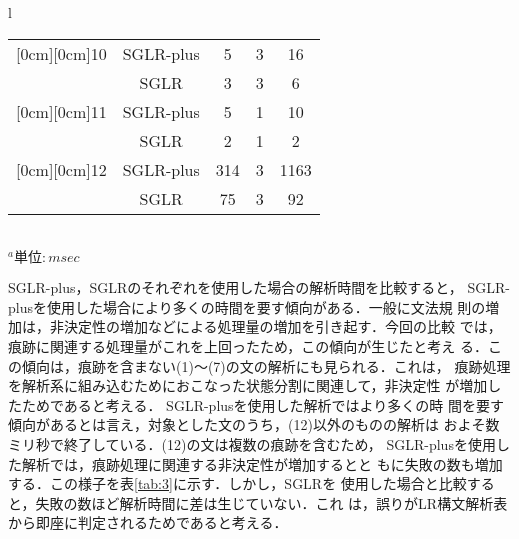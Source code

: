 \begin{table}[htbp]
\begin{center}
\begin{tabular}[htbp]{l}
\begin{tabular}[htbp]{|c||c|c|c|c|}
        \raisebox{-1.5ex}[0cm][0cm]{10} & SGLR-plus & 5  & 3  & 16 \\ \cline{2-5}
                                        & SGLR      & 3  & 3  & 6  \\ \hline\hline
        \raisebox{-1.5ex}[0cm][0cm]{11} & SGLR-plus & 5  & 1  & 10 \\ \cline{2-5}
                                        & SGLR      & 2  & 1  & 2  \\ \hline\hline
        \raisebox{-1.5ex}[0cm][0cm]{12} & SGLR-plus & 314 & 3  & 1163 \\ \cline{2-5}
                                        & SGLR      & 75  & 3  & 92  \\ \hline
      \end{tabular} \\
      $　^{a}単位: msec$
    \end{tabular}
  \end{center}
\end{table}

\vspace{-3mm}
SGLR-plus，SGLRのそれぞれを使用した場合の解析時間を比較すると，
SGLR-plusを使用した場合により多くの時間を要す傾向がある．一般に文法規
則の増加は，非決定性の増加などによる処理量の増加を引き起す．今回の比較
では，痕跡に関連する処理量がこれを上回ったため，この傾向が生じたと考え
る．この傾向は，痕跡を含まない(1)〜(7)の文の解析にも見られる．これは，
痕跡処理を解析系に組み込むためにおこなった状態分割に関連して，非決定性
が増加したためであると考える． SGLR-plusを使用した解析ではより多くの時
間を要す傾向があるとは言え，対象とした文のうち，(12)以外のものの解析は
およそ数ミリ秒で終了している．(12)の文は複数の痕跡を含むため，
SGLR-plusを使用した解析では，痕跡処理に関連する非決定性が増加するとと
もに失敗の数も増加する．この様子を表\ref{tab:3}に示す．しかし，SGLRを
使用した場合と比較すると，失敗の数ほど解析時間に差は生じていない．これ
は，誤りがLR構文解析表から即座に判定されるためであると考える．

